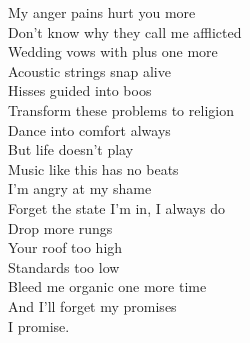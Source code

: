 My anger pains hurt you more\\
Don't know why they call me afflicted\\
Wedding vows with plus one more\\
Acoustic strings snap alive\\
Hisses guided into boos\\
Transform these problems to religion\\
Dance into comfort always\\
But life doesn't play\\
Music like this has no beats\\
I'm angry at my shame\\
Forget the state I'm in, I always do\\
Drop more rungs\\
Your roof too high\\
Standards too low\\
Bleed me organic one more time\\
And I'll forget my promises\\
I promise.\\

